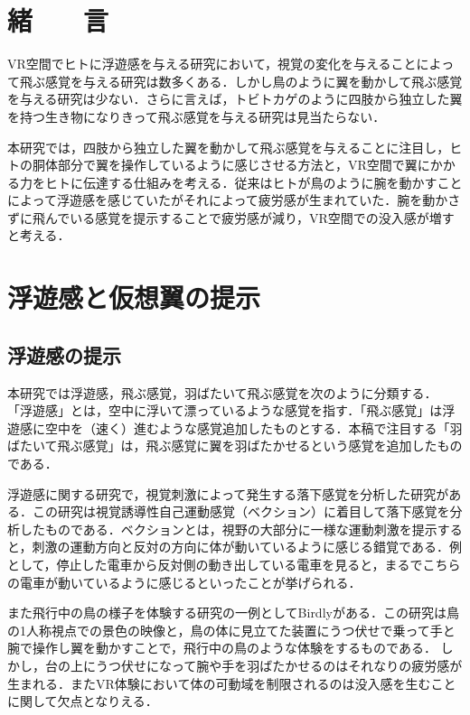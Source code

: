 \begin{small}
\section{緒　　言}
  VR空間でヒトに浮遊感を与える研究において，視覚の変化を与えることによって飛ぶ感覚を与える研究は数多くある．しかし鳥のように翼を動かして飛ぶ感覚を与える研究は少ない．さらに言えば，トビトカゲのように四肢から独立した翼を持つ生き物になりきって飛ぶ感覚を与える研究は見当たらない．

  本研究では，四肢から独立した翼を動かして飛ぶ感覚を与えることに注目し，ヒトの胴体部分で翼を操作しているように感じさせる方法と，VR空間で翼にかかる力をヒトに伝達する仕組みを考える．従来はヒトが鳥のように腕を動かすことによって浮遊感を感じていたがそれによって疲労感が生まれていた．腕を動かさずに飛んでいる感覚を提示することで疲労感が減り，VR空間での没入感が増すと考える．


\section{浮遊感と仮想翼の提示}
  \subsection{浮遊感の提示}
    本研究では浮遊感，飛ぶ感覚，羽ばたいて飛ぶ感覚を次のように分類する．
    「浮遊感」とは，空中に浮いて漂っているような感覚を指す．「飛ぶ感覚」は浮遊感に空中を（速く）進むような感覚追加したものとする．本稿で注目する「羽ばたいて飛ぶ感覚」は，飛ぶ感覚に翼を羽ばたかせるという感覚を追加したものである．

    浮遊感に関する研究で，視覚刺激によって発生する落下感覚を分析した研究がある\cite{奥川夏輝2017VR空間における視覚刺激によって発生する落下感覚の分析}．この研究は視覚誘導性自己運動感覚（ベクション）に着目して落下感覚を分析したものである．ベクションとは，視野の大部分に一様な運動刺激を提示すると，刺激の運動方向と反対の方向に体が動いているように感じる錯覚である\cite{妹尾武治2014ベクションとその周辺の近年の動向}．例として，停止した電車から反対側の動き出している電車を見ると，まるでこちらの電車が動いているように感じるといったことが挙げられる．

    また飛行中の鳥の様子を体験する研究の一例としてBirdly\cite{rheiner2014birdly}がある．この研究は鳥の1人称視点での景色の映像と，鳥の体に見立てた装置にうつ伏せで乗って手と腕で操作し翼を動かすことで，飛行中の鳥のような体験をするものである．
    しかし，台の上にうつ伏せになって腕や手を羽ばたかせるのはそれなりの疲労感が生まれる．またVR体験において体の可動域を制限されるのは没入感を生むことに関して欠点となりえる．


\end{small}
